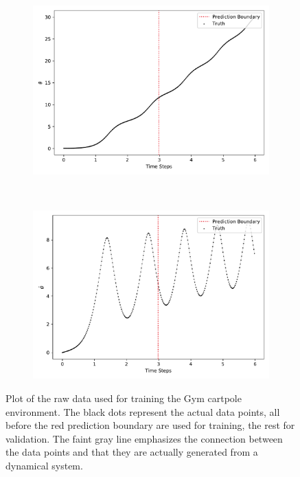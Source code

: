 \begin{figure}
\begin{subfigure}{0.5\linewidth}
				\includegraphics[width=\linewidth]{figures/experiments/environments/observations-cartpole-gym-N0-D2.pdf}
			\end{subfigure}%
			~
			\begin{subfigure}{0.5\linewidth}
				\centering
				\includegraphics[width=\linewidth]{figures/experiments/environments/observations-cartpole-gym-N0-D3.pdf}
			\end{subfigure}
			\caption{Plot of the raw data used for training the Gym cartpole environment. The black dots represent the actual data points, all before the red prediction boundary are used for training, the rest for validation. The faint gray line emphasizes the connection between the data points and that they are actually generated from a dynamical system.}
			\label{fig:envCartpoleGym}
		\end{figure}

